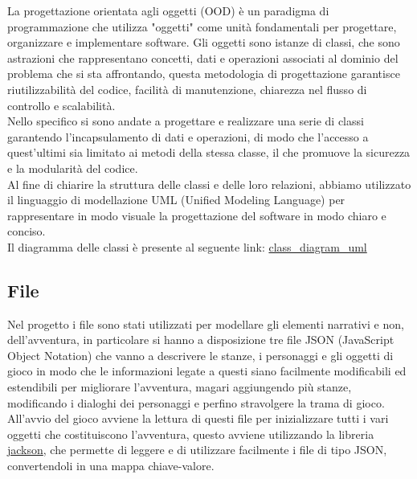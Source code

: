 \documentclass[italian,12pt,a4paper]{article}
\begin{document}
	La progettazione orientata agli oggetti (OOD) è un paradigma di programmazione che utilizza "oggetti" come unità fondamentali per progettare, organizzare e implementare software. Gli oggetti sono istanze di classi, che sono astrazioni che rappresentano concetti, dati e operazioni associati al dominio del problema che si sta affrontando, questa metodologia di progettazione garantisce riutilizzabilità del codice, facilità di manutenzione, chiarezza nel flusso di controllo e scalabilità.\\
	\linebreak
	Nello specifico si sono andate a progettare e realizzare una serie di classi garantendo l'incapsulamento di dati e operazioni, di modo che l'accesso a quest'ultimi sia limitato ai metodi della stessa classe, il che promuove la sicurezza e la modularità del codice.\\
	\linebreak
	Al fine di chiarire la struttura delle classi e delle loro relazioni, abbiamo utilizzato il linguaggio di modellazione UML (Unified Modeling Language) per rappresentare in modo visuale la progettazione del software in modo chiaro e conciso.\\
	\linebreak
	Il diagramma delle classi è presente al seguente link: \href{https://github.com/Giut0/Phosphorus/blob/main/docs/img/class_diagram.jpeg}{class\_diagram\_uml}
	
	\subsection{File}
	Nel progetto i file sono stati utilizzati per modellare gli elementi narrativi e non, dell'avventura, in particolare si hanno a disposizione tre file JSON (JavaScript Object Notation) che vanno a descrivere le stanze, i personaggi e gli oggetti di gioco in modo che le informazioni legate a questi siano facilmente modificabili ed estendibili per migliorare l'avventura, magari aggiungendo più stanze, modificando i dialoghi dei personaggi e perfino stravolgere la trama di gioco. \\
	\linebreak
	All'avvio del gioco avviene la lettura di questi file per inizializzare tutti i vari oggetti che costituiscono l'avventura, questo avviene utilizzando la libreria \href{https://github.com/FasterXML/jackson}{jackson}, che permette di leggere e di utilizzare facilmente i file di tipo JSON, convertendoli in una mappa chiave-valore.
	
\end{document}
